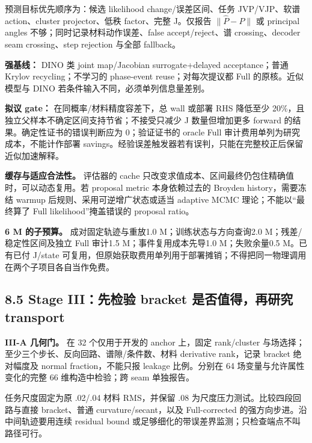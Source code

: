 \documentclass[
  11pt,
  a4paper,
]{article}
\begin{document}
预测目标优先顺序为：候选 likelihood change/误差区间、任务 JVP/VJP、软谱
action、cluster projector、低秩 factor、完整 J。仅报告
\(\|\widehat P-P\|\) 或 principal angles
不够；同时记录材料动作误差、false accept/reject、谱 crossing、decoder
seam crossing、step rejection 与全部 fallback。

\textbf{强基线：} DINO 类 joint map/Jacobian surrogate+delayed
acceptance；普通 Krylov recycling；不学习的 phase-event
reuse；对每次提议都 Full 的原核。近似模型与 DINO
若条件输入不同，必须单列信息量差别。

\textbf{拟议 gate：} 在同概率/材料精度容差下，总 wall 或部署 RHS
降低至少 20\%，且独立父样本不确定区间支持节省；不接受只减少 J
数量但增加更多 forward 的结果。确定性证书的错误判断应为 0；验证证书的
oracle Full 审计费用单列为研究成本，不能计作部署
savings。经验误差触发器若有误判，只能在完整校正后保留近似加速解释。

\textbf{缓存与适应合法性。} 评估器的 cache
只改变求值成本、区间最终仍包住精确值时，可以动态复用。若 proposal metric
本身依赖过去的 Broyden history，需要冻结 warmup
后规则、采用可逆增广状态或适当 adaptive MCMC 理论；不能以``最终算了 Full
likelihood''掩盖错误的 proposal ratio。

\textbf{6 M 的子预算。} 成对固定轨迹与重放1.0 M；训练状态与方向查询2.0
M；残差/稳定性区间及独立 Full 审计1.5 M；事件复用成本先导1.0
M；失败余量0.5 M。已有已付 J/state
可复用，但原始获取费用单列用于部署摊销；不得把同一物理调用在两个子项目各自当作免费。

\hypertarget{stage-iiiux5148ux68c0ux9a8c-bracket-ux662fux5426ux503cux5f97ux518dux7814ux7a76-transport}{%
\subsection{8.5 Stage III：先检验 bracket 是否值得，再研究
transport}\label{stage-iiiux5148ux68c0ux9a8c-bracket-ux662fux5426ux503cux5f97ux518dux7814ux7a76-transport}}

\textbf{III-A 几何门。} 在 32 个仅用于开发的 anchor 上，固定
rank/cluster 与场选择；至少三个步长、反向回路、谱隙/条件数、材料
derivative rank，记录 bracket 绝对幅度及 normal fraction，不能只报
leakage 比例。分别在 64 场变量与允许属性变化的完整 66 维构造中检验；跨
seam 单独报告。

任务尺度固定为原 .02/.04 材料 RMS，并保留 .08
为尺度压力测试。比较四段回路与直接 bracket、普通 curvature/secant，以及
Full-corrected 的强方向步进。沿中间轨迹要用连续 residual bound
或足够细化的带误差界监测；只检查端点不叫路径可行。
\end{document}
